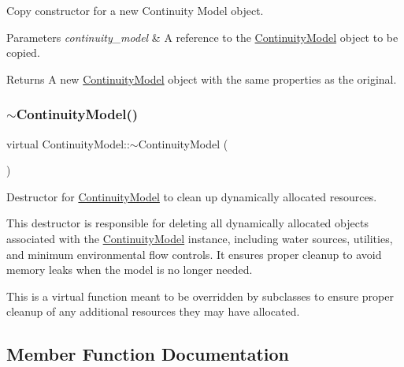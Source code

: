 Copy constructor for a new Continuity Model object. 


\begin{DoxyParams}{Parameters}
{\em continuity\+\_\+model} & A reference to the \mbox{\hyperlink{classContinuityModel}{Continuity\+Model}} object to be copied.\\
\hline
\end{DoxyParams}
\begin{DoxyReturn}{Returns}
A new \mbox{\hyperlink{classContinuityModel}{Continuity\+Model}} object with the same properties as the original. 
\end{DoxyReturn}
\mbox{\label{classContinuityModel_ae901ce342cd6e49c17994e4910873187}} 
\subsubsection{\texorpdfstring{$\sim$\+Continuity\+Model()}{~ContinuityModel()}}
{\footnotesize\ttfamily virtual Continuity\+Model\+::$\sim$\+Continuity\+Model (\begin{DoxyParamCaption}{ }\end{DoxyParamCaption})\hspace{0.3cm}{\ttfamily [virtual]}}



Destructor for \mbox{\hyperlink{classContinuityModel}{Continuity\+Model}} to clean up dynamically allocated resources. 

This destructor is responsible for deleting all dynamically allocated objects associated with the \mbox{\hyperlink{classContinuityModel}{Continuity\+Model}} instance, including water sources, utilities, and minimum environmental flow controls. It ensures proper cleanup to avoid memory leaks when the model is no longer needed.

This is a virtual function meant to be overridden by subclasses to ensure proper cleanup of any additional resources they may have allocated. 

\subsection{Member Function Documentation}
\mbox{\label{classContinuityModel_a7c37fec30b6381ded6150df1b1746953}} 
